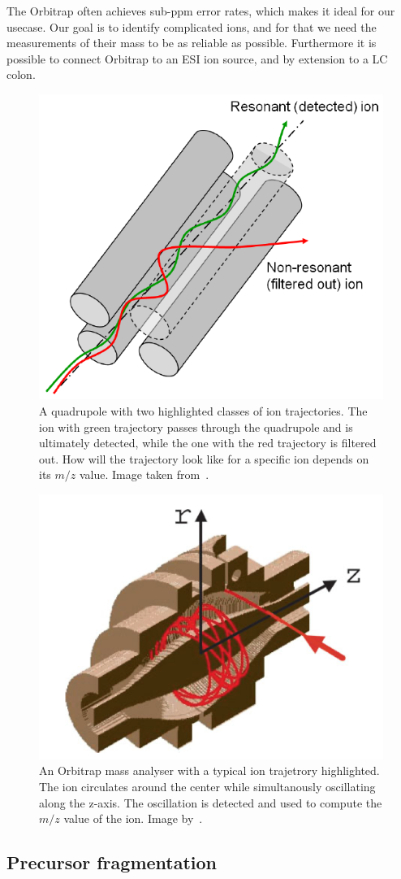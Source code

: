 \begin{description}
    The Orbitrap often achieves sub-ppm error rates, which makes it ideal for our usecase. Our goal is to identify complicated ions, and for that we need the measurements of their mass to be as reliable as possible. Furthermore it is possible to connect Orbitrap to an ESI ion source, and by extension to a LC colon.
\end{description}

\begin{figure}
  \centering
  \includegraphics[width=.4\linewidth]{img/quadrupole.png}
  \caption{A quadrupole with two highlighted classes of ion trajectories. The ion with green trajectory passes through the quadrupole and is ultimately detected, while the one with the red trajectory is filtered out. How will the trajectory look like for a specific ion depends on its \(m/z\) value. Image taken from~\citet{2021Mass}.}\label{fig:quadrupole}
\end{figure}

\begin{figure}
  \centering
  \includegraphics[width=.5\linewidth]{img/orbitrap.png}
  \caption{An Orbitrap mass analyser with a typical ion trajetrory highlighted. The ion circulates around the center while simultanously oscillating along the z-axis. The oscillation is detected and used to compute the \(m/z\) value of the ion. Image by~\citet{hu2005orbitrap}.}\label{fig:orbitrap}
\end{figure}

\subsection{Precursor fragmentation}\label{sec:fragmentation}

